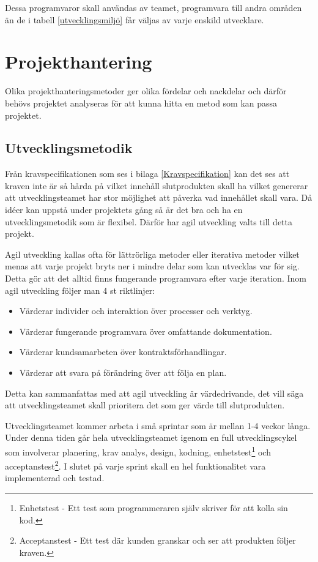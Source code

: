 \documentclass[a4paper,12pt,oneside,final]{extbook}
\begin{document}
Dessa programvaror skall användas av teamet, programvara till andra områden än de i tabell \ref{utvecklingsmiljö} får väljas av varje enskild utvecklare.
	



\chapter{Projekthantering}

Olika projekthanteringsmetoder ger olika fördelar och nackdelar och därför behövs projektet analyseras för att kunna hitta en metod som kan passa projektet.

\section{Utvecklingsmetodik}
Från kravspecifikationen som ses i bilaga \ref{Kravspecifikation} kan det ses att kraven inte är så hårda på vilket innehåll slutprodukten skall ha vilket genererar att utvecklingsteamet har stor möjlighet att påverka vad innehållet skall vara. Då idéer kan uppstå under projektets gång så är det bra och ha en utvecklingsmetodik som är flexibel. Därför har agil utveckling valts till detta projekt.

Agil utveckling kallas ofta för lättrörliga metoder eller iterativa metoder vilket menas att varje projekt bryts ner i mindre delar som kan utvecklas var för sig. Detta gör att det alltid finns fungerande programvara efter varje iteration. Inom agil utveckling följer man 4 st riktlinjer\cite{Sewell2012asd}:

\begin{itemize}
	\item Värderar individer och interaktion över processer och verktyg.
	\item Värderar fungerande programvara över omfattande dokumentation.
	\item Värderar kundsamarbeten över kontraktsförhandlingar.
	\item Värderar att svara på förändring över att följa en plan.
\end{itemize}
Detta kan sammanfattas med att agil utveckling är värdedrivande, det vill säga att utvecklingsteamet skall prioritera det som ger värde till slutprodukten.

Utvecklingsteamet kommer arbeta i små sprintar som är mellan 1-4 veckor långa. Under denna tiden går hela utvecklingsteamet igenom en full utvecklingscykel som involverar planering, krav analys, design, kodning, enhetstest\footnote{Enhetstest - Ett test som programmeraren själv skriver för att kolla sin kod.} och acceptanstest\footnote{Acceptanstest - Ett test där kunden granskar och ser att produkten följer kraven. }\cite{Sewell2012asd}. I slutet på varje sprint skall en hel funktionalitet vara implementerad och testad.  
\end{document}

